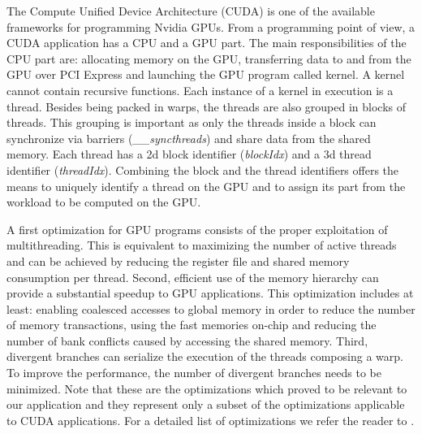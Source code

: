 The Compute Unified Device Architecture (CUDA) is one of the available frameworks for programming Nvidia GPUs. From a programming point of view, a CUDA application has a CPU and a GPU part. The main responsibilities of the CPU part are: allocating memory  on the GPU, transferring data to and from the GPU over PCI Express and launching the GPU program called kernel. A kernel cannot contain recursive functions. Each instance of a kernel in execution is a thread. Besides being packed in warps, the threads are also grouped in blocks of threads. This grouping is important as only the threads inside a block can synchronize via barriers (\emph{\_\_syncthreads}) and share data from the shared memory. Each thread has a 2d block identifier (\emph{blockIdx}) and a 3d thread identifier (\emph{threadIdx}). Combining the block and the thread identifiers offers the means to uniquely identify a thread on the GPU and to assign its part from the workload to be computed on the GPU.

A first optimization for GPU programs consists of the proper exploitation of multithreading. This is equivalent to maximizing the number of active threads and can be achieved by reducing the register file and shared memory consumption per thread. Second, efficient use of the memory hierarchy can provide a substantial speedup to GPU applications. This optimization includes at least: enabling coalesced accesses to global memory in order to reduce the number of memory transactions, using the fast memories on-chip and reducing the number of bank conflicts caused by accessing the shared memory. Third, divergent branches can serialize the execution of the threads composing a warp. To improve the performance, the number of divergent branches needs to be minimized. Note that these are the optimizations which proved to be relevant to our application and they represent only a subset of the optimizations applicable to CUDA applications. For a detailed list of optimizations we refer the reader to \cite{cuda}.




